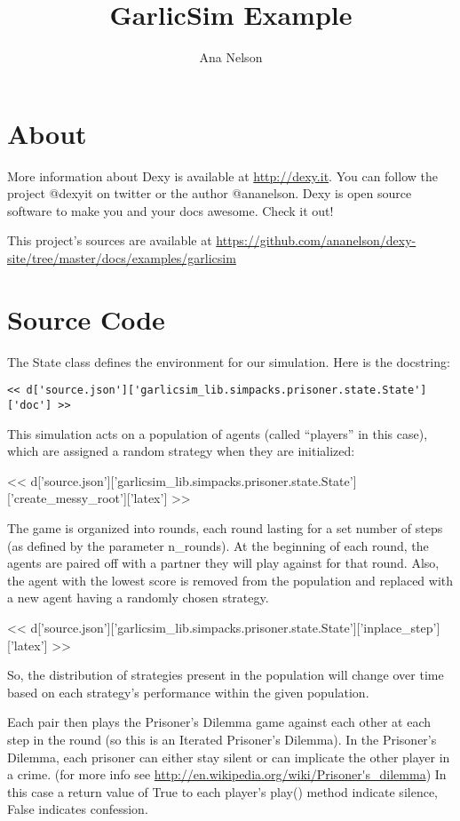\documentclass[a4paper]{tufte-handout}
\title{GarlicSim Example}
\author{Ana Nelson}
\begin{document}
\maketitle

\section{About}
More information about Dexy is available at \url{http://dexy.it}. You can
follow the project @dexyit on twitter or the author @ananelson. Dexy is open
source software to make you and your docs awesome. Check it out!

This project's sources are available at
\url{https://github.com/ananelson/dexy-site/tree/master/docs/examples/garlicsim}

\section{Source Code}

The State class defines the environment for our simulation. Here is the
docstring:

\begin{verbatim}
<< d['source.json']['garlicsim_lib.simpacks.prisoner.state.State']['doc'] >>
\end{verbatim}

This simulation acts on a population of agents (called ``players'' in this
case), which are assigned a random strategy when they are initialized:

<< d['source.json']['garlicsim_lib.simpacks.prisoner.state.State']['create_messy_root']['latex'] >>

The game is organized into rounds, each round lasting for a set number of steps
(as defined by the parameter n\_rounds). At the beginning of each round, the
agents are paired off with a partner they will play against for that round.
Also, the agent with the lowest score is removed from the population and
replaced with a new agent having a randomly chosen strategy.

<< d['source.json']['garlicsim_lib.simpacks.prisoner.state.State']['inplace_step']['latex'] >>

So, the distribution of strategies present in the population will change over
time based on each strategy's performance within the given population.

Each pair then plays the Prisoner's Dilemma game against each other at each
step in the round (so this is an Iterated Prisoner's Dilemma). In the
Prisoner's Dilemma, each prisoner can either stay silent or can implicate the
other player in a crime. (for more info see \url{http://en.wikipedia.org/wiki/Prisoner's\_dilemma})
In this case a return value of True to each player's play() method indicate
silence, False indicates confession.
\end{document}
